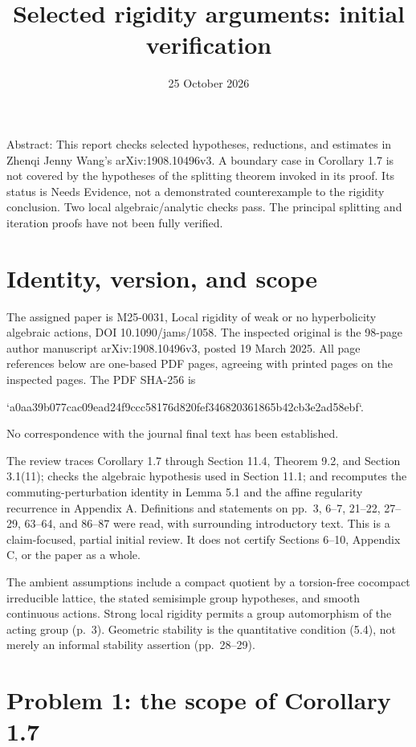 \documentclass[10pt]{article}
\title{Selected rigidity arguments: initial verification}
\author{}
\date{25 October 2026}
\begin{document}
\maketitle
Abstract: This report checks selected hypotheses, reductions, and estimates in Zhenqi Jenny Wang’s arXiv:1908.10496v3. A boundary case in Corollary 1.7 is not covered by the hypotheses of the splitting theorem invoked in its proof. Its status is Needs Evidence, not a demonstrated counterexample to the rigidity conclusion. Two local algebraic/analytic checks pass. The principal splitting and iteration proofs have not been fully verified.\par
\section*{Identity, version, and scope}
The assigned paper is M25-0031, Local rigidity of weak or no hyperbolicity algebraic actions, DOI 10.1090/jams/1058. The inspected original is the 98-page author manuscript arXiv:1908.10496v3, posted 19 March 2025. All page references below are one-based PDF pages, agreeing with printed pages on the inspected pages. The PDF SHA-256 is\par
`a0aa39b077cac09ead24f9ccc58176d820fef346820361865b42cb3e2ad58ebf`.\par
No correspondence with the journal final text has been established.\par
The review traces Corollary 1.7 through Section 11.4, Theorem 9.2, and Section 3.1(11); checks the algebraic hypothesis used in Section 11.1; and recomputes the commuting-perturbation identity in Lemma 5.1 and the affine regularity recurrence in Appendix A. Definitions and statements on pp. 3, 6–7, 21–22, 27–29, 63–64, and 86–87 were read, with surrounding introductory text. This is a claim-focused, partial initial review. It does not certify Sections 6–10, Appendix C, or the paper as a whole.\par
The ambient assumptions include a compact quotient by a torsion-free cocompact irreducible lattice, the stated semisimple group hypotheses, and smooth continuous actions. Strong local rigidity permits a group automorphism of the acting group (p. 3). Geometric stability is the quantitative condition (5.4), not merely an informal stability assertion (pp. 28–29).\par
\section*{Problem 1: the scope of Corollary 1.7}
\end{document}
